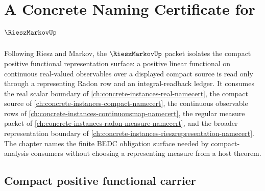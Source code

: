 \chapter{A Concrete Naming Certificate for $\RieszMarkovUp$}
\label{ch:concrete-instances-riesz-markov-namecert}

Following Riesz and Markov, the $\RieszMarkovUp$ packet isolates the compact positive functional representation surface: a positive linear functional on continuous real-valued observables over a displayed compact source is read only through a representing Radon row and an integral-readback ledger. It consumes the real scalar boundary of \autoref{ch:concrete-instances-real-namecert}, the compact source of \autoref{ch:concrete-instances-compact-namecert}, the continuous observable rows of \autoref{ch:concrete-instances-continuousmap-namecert}, the regular measure packet of \autoref{ch:concrete-instances-radon-measure-namecert}, and the broader representation boundary of \autoref{ch:concrete-instances-rieszrepresentation-namecert}. The chapter names the finite BEDC obligation surface needed by compact-analysis consumers without choosing a representing measure from a host theorem.

\section{Compact positive functional carrier}
\label{sec:riesz-markov-compact-positive-functional-carrier}

